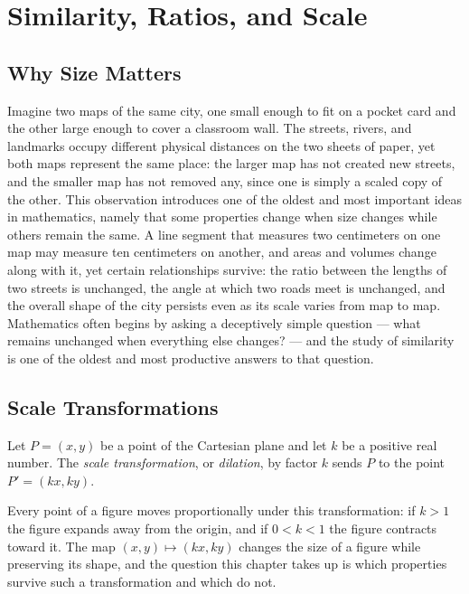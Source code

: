 \chapter{Similarity, Ratios, and Scale}
\label{ch:ch01-similarity-ratios}

\section{Why Size Matters}

Imagine two maps of the same city, one small enough to fit on a pocket card
and the other large enough to cover a classroom wall. The streets, rivers, and
landmarks occupy different physical distances on the two sheets of paper, yet
both maps represent the same place: the larger map has not created new
streets, and the smaller map has not removed any, since one is simply a
scaled copy of the other. This observation introduces one of the oldest and
most important ideas in mathematics, namely that some properties change when
size changes while others remain the same. A line segment that measures two
centimeters on one map may measure ten centimeters on another, and areas and
volumes change along with it, yet certain relationships survive: the ratio
between the lengths of two streets is unchanged, the angle at which two roads
meet is unchanged, and the overall shape of the city persists even as its
scale varies from map to map. Mathematics often begins by asking a
deceptively simple question --- what remains unchanged when everything else
changes? --- and the study of similarity is one of the oldest and most
productive answers to that question.

\section{Scale Transformations}

\begin{definition}
Let $P = (x,y)$ be a point of the Cartesian plane and let $k$ be a positive
real number. The \emph{scale transformation}, or \emph{dilation}, by factor
$k$ sends $P$ to the point $P' = (kx, ky)$.
\end{definition}

Every point of a figure moves proportionally under this transformation: if
$k > 1$ the figure expands away from the origin, and if $0 < k < 1$ the
figure contracts toward it. The map $(x,y) \mapsto (kx,ky)$ changes the size
of a figure while preserving its shape, and the question this chapter takes
up is which properties survive such a transformation and which do not.

